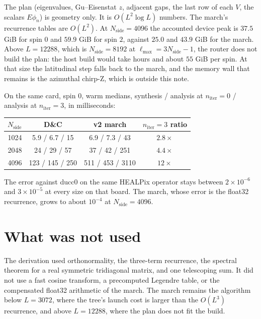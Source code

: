 \documentclass[11pt,a4paper]{article}
\numberwithin{equation}{section}
\begin{document}
The plan (eigenvalues, Gu--Eisenstat $z$, adjacent gaps, the last row of each $V$, the
scalars $E\phi_n$) is geometry only. It is $O(L^2\log L)$ numbers. The march's recurrence
tables are $O(L^2)$. At $N_{\mathrm{side}}=4096$ the accounted device peak is $37.5$ GiB
for spin $0$ and $59.9$ GiB for spin $2$, against $25.0$ and $43.9$ GiB for the march.
Above $L=12288$, which is $N_{\mathrm{side}}=8192$ at $\ell_{\max}=3N_{\mathrm{side}}-1$,
the router does not build the plan: the host build would take hours and about $55$ GiB per
spin. At that size the latitudinal step falls back to the march, and the memory wall that
remains is the azimuthal chirp-Z, which is outside this note.

On the same card, spin $0$, warm medians, synthesis / analysis at $n_{\mathrm{iter}}=0$ /
analysis at $n_{\mathrm{iter}}=3$, in milliseconds:

\begin{center}
\small
\begin{tabular}{@{}rccc@{}}
\toprule
$N_{\mathrm{side}}$ & D\&C & v2 march & $n_{\mathrm{iter}}=3$ ratio \\
\midrule
1024 & 5.9 / 6.7 / 15 & 6.9 / 7.3 / 43 & $2.8\times$ \\
2048 & 24 / 29 / 57 & 37 / 42 / 251 & $4.4\times$ \\
4096 & 123 / 145 / 250 & 511 / 453 / 3110 & $12\times$ \\
\bottomrule
\end{tabular}
\end{center}

The error against ducc0 on the same HEALPix operator stays between $2\times 10^{-6}$ and
$3\times 10^{-5}$ at every size on that board. The march, whose error is the float32
recurrence, grows to about $10^{-4}$ at $N_{\mathrm{side}}=4096$.

\section{What was not used}
\label{sec:not}

The derivation used orthonormality, the three-term recurrence, the spectral theorem for a
real symmetric tridiagonal matrix, and one telescoping sum. It did not use a fast cosine
transform, a precomputed Legendre table, or the compensated float32 arithmetic of the march.
The march remains the algorithm below $L=3072$, where the tree's launch cost is larger
than the $O(L^3)$ recurrence, and above $L=12288$, where the plan does not fit the build.
\end{document}
